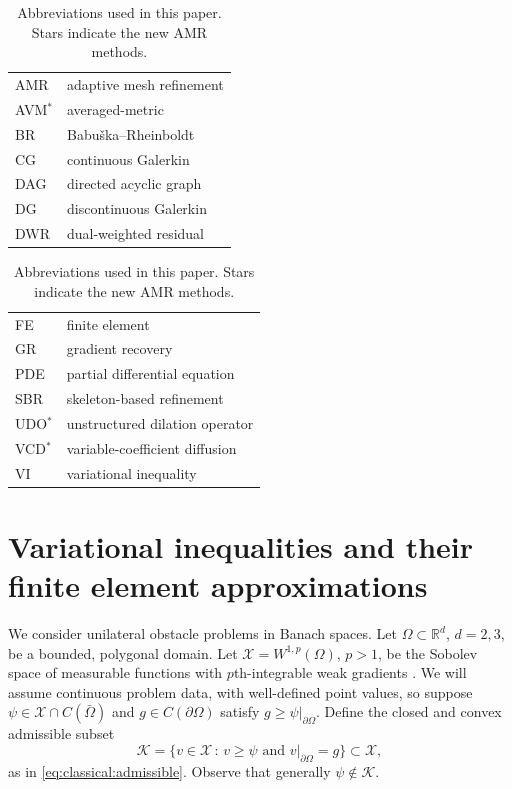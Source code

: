 \documentclass[]{interact}
\theoremstyle{plain}%
\theoremstyle{definition}
\theoremstyle{remark}
\newcommand{\RR}{\mathbb{R}}
\newcommand{\cK}{\mathcal{K}}
\newcommand{\cX}{\mathcal{X}}
\begin{document}
\begin{table}[ht]
\centering
\begin{minipage}[t]{0.45\textwidth}
\vspace{0pt}
{\small
\begin{tabular}{ll} \\
AMR       & adaptive mesh refinement \\
AVM$^*$   & averaged-metric \\
BR        & Babu\v{s}ka--Rheinboldt \\
CG        & continuous Galerkin \\
DAG       & directed acyclic graph \\
DG        & discontinuous Galerkin \\
DWR       & dual-weighted residual
\end{tabular}
}
\end{minipage}
\quad
\begin{minipage}[t]{0.45\textwidth}
\vspace{0pt}
{\small
\begin{tabular}{ll} \\
FE        & finite element \\
GR        & gradient recovery \\
PDE       & partial differential equation \\
SBR       & skeleton-based refinement \\
UDO$^*$   & unstructured dilation operator \\
VCD$^*$   & variable-coefficient diffusion \\
VI        & variational inequality
\end{tabular}
}
\end{minipage}
\caption{Abbreviations used in this paper.  Stars indicate the new AMR methods.}
\label{tab:abbrev}
\end{table}


\section{Variational inequalities and their finite element approximations} \label{sec:vifem}

We consider unilateral obstacle problems in Banach spaces.  Let $\Omega \subset \RR^d$, $d=2,3$, be a bounded, polygonal domain.  Let $\cX = W^{1,p}(\Omega)$, $p>1$, be the Sobolev space of measurable functions with $p$th-integrable weak gradients \cite{Evans2010}.  We will assume continuous problem data, with well-defined point values, so suppose $\psi \in \cX \cap C(\bar\Omega)$ and $g\in C(\partial \Omega)$ satisfy $g \ge \psi|_{\partial\Omega}$.  Define the closed and convex admissible subset
\begin{equation} \label{eq:admissible}
\cK = \{v \in \cX \,:\, v \ge \psi \text{ and } v|_{\partial \Omega} = g\} \subset \cX,
\end{equation}
as in \eqref{eq:classical:admissible}.  Observe that generally $\psi\notin\cK$.
\end{document}
